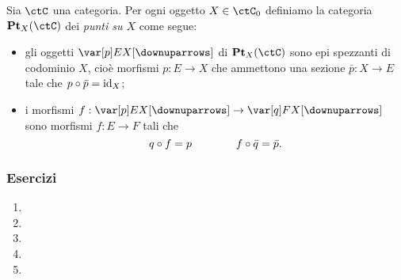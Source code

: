 \begin{example}\label{ex_cat_punti}
	Sia \(\ctC\) una categoria. Per ogni oggetto \(X\in\ctC_0\) definiamo la categoria \(\cate{Pt}_X(\ctC)\) dei \emph{punti su \(X\)} come segue:
	\begin{itemize}
		\item gli oggetti \(\var [p]EX[\downuparrows]\) di \(\cate{Pt}_X(\ctC)\) sono epi spezzanti di codominio \(X\), cioè morfismi \(p : E \to X\) che ammettono una sezione \(\bar p : X\to E\) tale che \(p\circ \bar p = \mathrm{id}_X\);
		\item i morfismi \(f : \var [p] EX[\downuparrows]\to \var[q] FX[\downuparrows]\) sono morfismi \(f : E \to F\) tali che
		      \[q\circ f = p \qquad \qquad f\circ \bar q = \bar p.\]
	\end{itemize}
\end{example}

\subsubsection*{Esercizi}
\begin{enumerate}
	\item
	\item
	\item
	\item
	\item
\end{enumerate}
